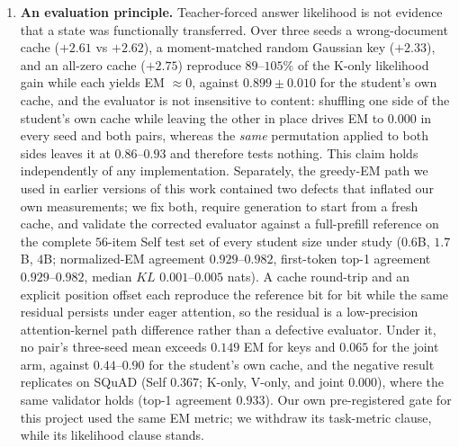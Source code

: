 \documentclass[11pt]{article}
\begin{document}
\begin{enumerate}
\item \textbf{An evaluation principle.} Teacher-forced answer likelihood is not
  evidence that a state was functionally transferred. Over three seeds a
  wrong-document cache ($+2.61$ vs $+2.62$), a moment-matched random Gaussian
  key ($+2.33$), and an all-zero cache ($+2.75$) reproduce $89$--$105\%$ of the
  K-only likelihood gain while each yields EM $\approx 0$, against
  $0.899\pm0.010$ for the student's own cache, and the evaluator is not
  insensitive to content: shuffling one side of the student's own cache while
  leaving the other in place drives EM to $0.000$ in every seed and both pairs,
  whereas the \emph{same} permutation applied to both sides leaves it at
  $0.86$--$0.93$ and therefore tests nothing. This claim holds independently of
  any implementation. Separately, the greedy-EM path we used in earlier versions
  of this work contained two defects that inflated our own measurements; we fix
  both, require generation to start from a fresh cache, and validate the
  corrected evaluator against a full-prefill reference on the complete
  $56$-item Self test set of every student size under study ($0.6$B, $1.7$B,
  $4$B; normalized-EM agreement $0.929$--$0.982$, first-token top-1 agreement
  $0.929$--$0.982$, median $KL$ $0.001$--$0.005$ nats). A cache round-trip and
  an explicit position offset each reproduce the reference bit for bit while the
  same residual persists under eager attention, so the residual is a
  low-precision attention-kernel path difference rather than a defective
  evaluator. Under it, no pair's three-seed mean exceeds $0.149$ EM for keys and
  $0.065$ for the joint arm, against $0.44$--$0.90$ for the student's own cache,
  and the negative result replicates on SQuAD (Self $0.367$; K-only, V-only, and
  joint $0.000$), where the same validator holds (top-1 agreement $0.933$). Our
  own pre-registered gate for this project used the same EM metric; we withdraw
  its task-metric clause, while its likelihood clause stands.


\end{enumerate}
\end{document}
